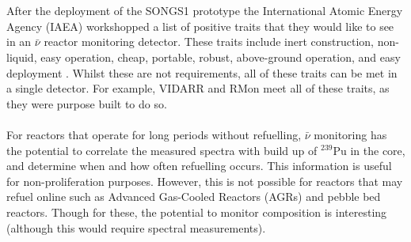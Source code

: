 \\\\After the deployment of the SONGS1 prototype the International Atomic Energy Agency (IAEA) workshopped a list of positive traits that they would like to see in an $\bar{\nu}$ reactor monitoring detector. These traits include inert construction, non-liquid, easy operation, cheap, portable, robust, above-ground operation, and easy deployment \cite{IAEA_2008}. Whilst these are not requirements, all of these traits can be met in a single detector. For example, VIDARR and RMon meet all of these traits, as they were purpose built to do so. 
\\\\For reactors that operate for long periods without refuelling, $\bar{\nu}$ monitoring has the potential to correlate the measured spectra with build up of $^{239}$Pu in the core, and determine when and how often refuelling occurs. This information is useful for non-proliferation purposes. However, this is not possible for reactors that may refuel online such as Advanced Gas-Cooled Reactors (AGRs) and pebble bed reactors. Though for these, the potential to monitor composition is interesting (although this would require spectral measurements).

